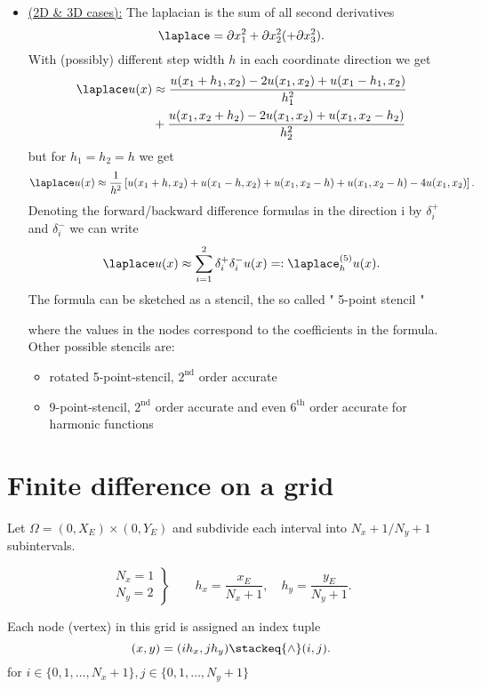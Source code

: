 \begin{itemize}
	\item \underline{(2D \& 3D cases):} 
		The laplacian is the sum of all second derivatives
		\[
			\laplace = \partial x_1^2 + \partial x_2^2 (+\partial x_3^2)
		.\] 
		With (possibly) different step width $h$ in each coordinate direction we get
		\begin{align*}
			\laplace u(x) &\approx \frac{u(x_1 + h_1, x_2) - 2u(x_1, x_2) + u(x_1 -h_1, x_2)}{h_1^2}\\
						  &+ \frac{u(x_1, x_2 + h_2) - 2u(x_1, x_2) + u(x_1, x_2 -h_2)}{h_2^2}
		\end{align*}
		but for $h_1 = h_2 = h$ we get
		\[
			\laplace u(x) \approx \frac{1}{h^2}\left[u(x_1+ h, x_2) + u(x_1-h, x_2) + u(x_1, x_2 -h) + u(x_1, x_2 -h) -4u(x_1, x_2)\right]
		.\] 
		Denoting the forward/backward difference formulas
		in the direction i by $\delta_{i}^{+}$ and $\delta_{i}^{-}$ we can write
		\[
			\laplace u(x) \approx \sum_{i=1}^{2}{\delta_{i}^{+}\delta_{i}^{-}u(x)}=:\laplace_{h}^{(5)}u(x)
		.\] 
		The formula can be sketched as a stencil, the so called " 5-point stencil "
		
		where the values in the nodes correspond to the coefficients in the formula.
		Other possible stencils are:
		\begin{itemize}
			\item rotated 5-point-stencil, $2^{\text{nd}}$ order accurate
				
			\item 9-point-stencil,  $2^{\text{nd}}$ order accurate and even $6^{\text{th}}$ order accurate for harmonic functions
				
		\end{itemize}
\end{itemize}

\section{Finite difference on a grid}%
\label{sec:Finite difference on a grid}
Let $\Omega =(0, X_{E}) \times (0,Y_{E})$ and subdivide each interval into $N_{x}+1 / N_{y} + 1$ subintervals.

\[
\left.
	\begin{array}{c}
	N_{x} = 1 \\
	N_{y} = 2
\end{array}
\right\} \qquad
h_{x} = \frac{x_{E}}{N_{x}+1}, \quad h_{y}= \frac{y_{E}}{N_{y}+1}
.\] 


Each node (vertex) in this grid is assigned an index tuple
\[
	(x,y) = (ih_{x}, jh_{y}) \stackeq{\wedge} (i,j)
.\] 
for $i \in \{0,1, \ldots , N_{x}+1\}, j \in  \{0,1, \ldots , N_{y}+1\}$

